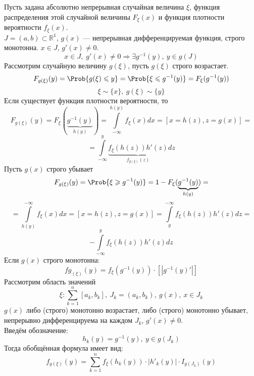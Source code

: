 Пусть задана абсолютно непрерывная случайная величина $\xi$, функция распределения этой случайной величины $F_{\xi} (x) $ и функция плотности вероятности $ f_{\xi} (x) $. \\
$ J = (a, b) \subset \mathbb{R}^1$, $g(x)$ --- непрерывная дифференцируемая функция, строго монотонна. $x \in J$, $g'(x) \neq 0$. 
\[
	x \in J,\; g'(x) \neq 0 \Rightarrow \exists g^{-1} (y), \ y \in g(J)
\] 
Рассмотрим случайную величину $g(\xi)$, пусть $g(\xi)$ строго возрастает.
\[
	F_{g(\xi)}(y) = \Prob \{ g(\xi) \leqslant y \} = \Prob \{ \xi \leqslant g^{-1}(y) \} = F_{\xi} (g^{-1}(y))
\]
\[
	\xi \sim \{ x \}, \ g(\xi) \sim \{ y \}
\]
Если существует функция плотности вероятности, то
\[
	F_{g(\xi)} (y) = F_{\xi} (\underbrace{g^{-1}(y)}_{h(y)}) = \int\limits_{-\infty}^{h(y)} f_{\xi} (x) dx = [x = h(z), z = g(x)] = 
\]
\[
	= \int\limits_{-\infty}^{y} \underbrace{f_{\xi} (h(z)) h'(z)}_{f_{g(\xi) }(z)} dz
\]
Пусть $g(x)$ строго убывает
\[
	F_{g(\xi)} (y) = \Prob \{ \xi \geqslant g^{-1}(y) \} = 1 - F_{\xi} (\underbrace{g^{-1}(y)}_{h(y)}) = 
\]
\[
	= \int\limits_{h(y)}^{-\infty} f_{\xi} (x) dx = [ x = h(z), z = g(x) ] = \int\limits_{y}^{-\infty} f_{\xi} (h(z)) h'(z) dz =
\]
\[
	- \int\limits_{-\infty}^y f_{\xi} (h(z)) h'(z) dz
\]
Если $g(x)$ строго монотонна:
\[
	fg_{(\xi)} (y) = f_{\xi} (g^{-1}(y)) \cdot [|g^{-1}(y)'|]
\]
Рассмотрим область значений
\[
	\xi : \sum\limits_{k = 1}^{n} [a_k, b_k], \ J_k = (a_k, b_k), \ g(x), \ x \in J_k
\]
$g(x)$ либо (строго) монотонно возрастает, либо (строго) монотонно убывает, непрерывно дифференцируема на каждом $J_k$, $g'(x) \neq 0$. \\
Введём обозначение:
\[
	h_k(y) = g^{-1}(y), \ y \in g(J_k)
\]
Тогда обобщённая формула имеет вид:
\[
	f_{g(\xi)} (y) = \sum\limits_{k = 1}^{n} f_{\xi} (h_k(y)) \cdot | {h'}_k(y) | \cdot I_{g(J_k)} (y)
\]
